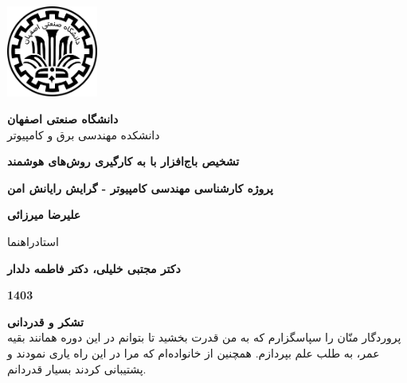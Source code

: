\thispagestyle{empty}
\begin{center}
\includegraphics[height=3cm]{iut_logo.png}
\vspace{0.4cm}

{\large
	\textbf{دانشگاه صنعتی اصفهان}\\
	دانشکده مهندسی برق و کامپیوتر
}
\vspace{3.5cm}

{\LARGE
	\textbf{تشخیص باج‌افزار با به کارگیری روش‌های هوشمند}\\
}
\vspace{3.5cm}

{\large
	\textbf{پروژه کارشناسی مهندسی کامپیوتر - گرایش رایانش امن}\\
}
\vspace{1cm}

{\Large
	\textbf{علیرضا میرزائی}\\
}
\vspace{2.5cm}

{\large
	استادراهنما\\
}
\vspace{0.5cm}

{\Large
	\textbf{دکتر مجتبی خلیلی، دکتر فاطمه دلدار}\\
}
\vspace{3.5cm}

{\Large
	\textbf{1403}
}

\end{center}
\restoregeometry
\pagebreak


\thispagestyle{empty}
\vspace*{3cm}

{\large
	\textbf{تشکر و قدردانی}\\


پروردگار منّان را سپاسگزارم که به من قدرت بخشید تا بتوانم در این دوره همانند بقیه عمر، به طلب علم بپردازم. همچنین از خانواده‌ام که مرا در این راه یاری نمودند و پشتیبانی کردند بسیار قدردانم.

}
\restoregeometry
\pagebreak


